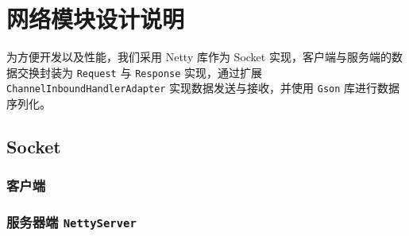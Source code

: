 \documentclass{article}
\begin{document}


\section{网络模块设计说明}

为方便开发以及性能，我们采用 Netty 库作为 Socket 实现，客户端与服务端的数据交换封装为 \texttt{Request} 与 \texttt{Response} 实现，通过扩展 \texttt{ChannelInboundHandlerAdapter} 实现数据发送与接收，并使用 \texttt{Gson} 库进行数据序列化。

\subsection{Socket}
\subsubsection{客户端}

\subsubsection{服务器端 \texttt{NettyServer}}

\begin{table}[H]
  \centering
\end{table}
\end{document}
